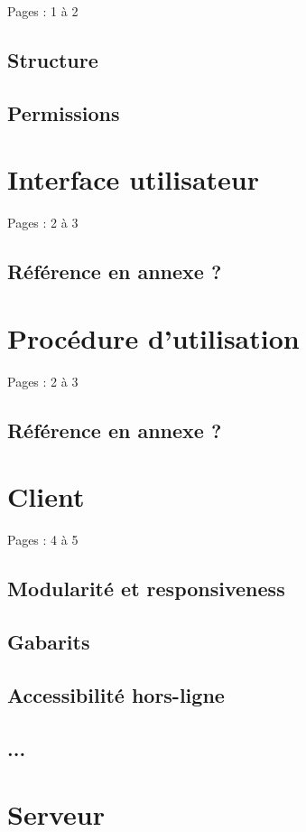 \documentclass{eplmastersthesis_FR}
\begin{document}
			Pages : 1 à 2

			\subsection*{Structure}
			\subsection*{Permissions}

		\section{Interface utilisateur}

			Pages : 2 à 3

			\subsection*{Référence en annexe ?}

		\section{Procédure d'utilisation}

			Pages : 2 à 3

			\subsection*{Référence en annexe ?}

		\section{Client}

			Pages : 4 à 5
			\subsection*{Modularité et responsiveness}
			\subsection*{Gabarits}
			\subsection*{Accessibilité hors-ligne}
			\subsection*{...}

		\section{Serveur}
\end{document}
